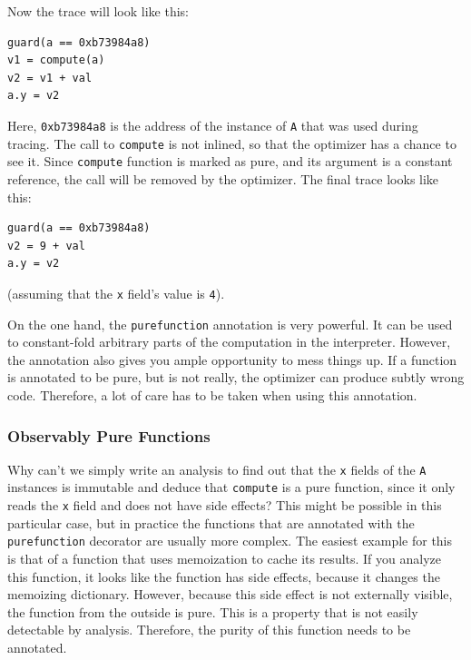 \documentclass{sigplanconf}
\begin{document}
Now the trace will look like this:
%
\begin{lstlisting}[mathescape,basicstyle=\ttfamily]
guard(a == 0xb73984a8)
v1 = compute(a)
v2 = v1 + val
a.y = v2
\end{lstlisting}

Here, \texttt{0xb73984a8} is the address of the instance of \texttt{A} that was used
during tracing. The call to \texttt{compute} is not inlined, so that the optimizer
has a chance to see it. Since \texttt{compute} function is marked as pure, and its
argument
is a constant reference, the call will be removed by the optimizer. The final
trace looks like this:
%
\begin{lstlisting}[mathescape,basicstyle=\ttfamily]
guard(a == 0xb73984a8)
v2 = 9 + val
a.y = v2
\end{lstlisting}

(assuming that the \texttt{x} field's value is \texttt{4}).

On the one hand, the \texttt{purefunction} annotation is very powerful. It can be
used to constant-fold arbitrary parts of the computation in the interpreter.
However, the annotation also gives you ample opportunity to mess things up. If a
function is annotated to be pure, but is not really, the optimizer can produce
subtly wrong code. Therefore, a lot of care has to be taken when using this
annotation.


\subsubsection{Observably Pure Functions}

Why can't we simply write an analysis to find out that the \texttt{x} fields of the
\texttt{A} instances is immutable and deduce that \texttt{compute} is a pure function,
since it only reads the \texttt{x} field and does not have side effects? This might
be possible in this particular case, but in practice the functions that are
annotated with the \texttt{purefunction} decorator are usually more complex.
The easiest example for this is that of a function that uses memoization to
cache its results. If you analyze this function, it looks like the function has
side effects, because it changes the memoizing dictionary. However, because this side
effect is not externally visible, the function from the outside is pure. This is
a property that is not easily detectable by analysis. Therefore, the purity
of this function needs to be annotated.
\end{document}
